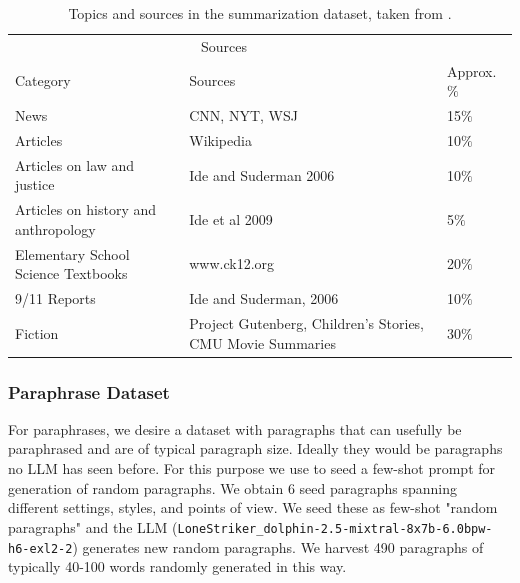 \documentclass{article}
\begin{document}
\begin{table}
	\caption{Topics and sources in the summarization dataset, taken from \cite{multirc2}.}
	\centering
	\begin{tabular}{lll}
		\toprule
		\multicolumn{2}{c}{Sources}                   \\
		\cmidrule(r){1-2}
		Category     & Sources     & Approx. $\%$ \\
		\midrule
		News  	 	& CNN, NYT, WSJ & 15$\%$    \\
		Articles	& Wikipedia		& 10$\%$    \\
		Articles on law and justice	& Ide and Suderman 2006 & 10$\%$\\
		Articles on history and anthropology 	& Ide et al 2009	& 5$\%$ \\
		Elementary School Science Textbooks	& www.ck12.org	& 20$\%$\\
		9/11 Reports	& Ide and Suderman, 2006	& 10$\%$ \\
		Fiction		& Project Gutenberg, Children's Stories, CMU Movie Summaries & 30$\%$\\
		
		\bottomrule
	\end{tabular}
	\label{tab:summarizationdataset}
\end{table}

\subsubsection{Paraphrase Dataset}

For paraphrases, we desire a dataset with paragraphs that can usefully be paraphrased and are of typical paragraph size. 
Ideally they would be paragraphs no LLM has seen before.
For this purpose we use \citep{randomparagraphs} to seed a few-shot prompt for generation of random paragraphs.
We obtain 6 seed paragraphs spanning different settings, styles, and points of view.  
We seed these as few-shot "random paragraphs" and the LLM  (\texttt{LoneStriker\_dolphin-2.5-mixtral-8x7b-6.0bpw-h6-exl2-2}) generates new random paragraphs.
We harvest 490 paragraphs of typically 40-100 words randomly generated in this way. 
\end{document}
